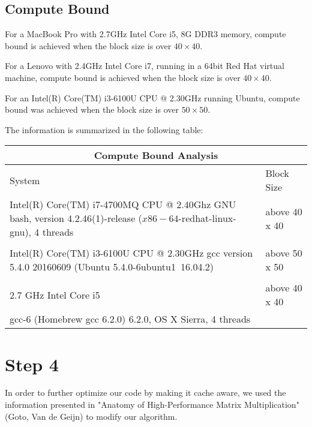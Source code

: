 \documentclass[12pt]{article}
\newcommand{\0}{\mathbf{0}}
\begin{document}
\subsection{Compute Bound}

For a MacBook Pro with 2.7GHz Intel Core i5, 8G DDR3 memory, compute bound is achieved when the block size is over $40\times 40$.

\bigskip

For a Lenovo with 2.4GHz Intel Core i7, running in a 64bit Red Hat virtual machine, compute bound is achieved when the block size is over $40\times 40$.

\bigskip

For an Intel(R) Core(TM) i3-6100U CPU @ 2.30GHz running Ubuntu, compute bound was achieved when the block size is over $50\times 50$. 


\newpage

The information is summarized in the following table:

\begin{center}

    \begin{tabular}{ |p{9cm}||p{3cm}|}
	\hline
	\multicolumn{2}{|c|}{Compute Bound Analysis} \\
	\hline
	System& Block Size \\
	\hline
	Intel(R) Core(TM) i7-4700MQ CPU @ 2.40Ghz
	GNU bash, version 4.2.46(1)-release ($x86-64$-redhat-linux-gnu), 4 threads & above 40 x 40\\
	&  \\
	Intel(R) Core(TM) i3-6100U CPU @ 2.30GHz
	gcc version 5.4.0 20160609 (Ubuntu 5.4.0-6ubuntu1~16.04.2)
	& above 50 x 50 \\
	& \\
	2.7 GHz Intel Core i5 & above 40 x 40   \\
	gcc-6 (Homebrew gcc 6.2.0) 6.2.0, OS X Sierra, 4 threads &  \\
	\hline
    \end{tabular}

\end{center}







	\section{Step 4}
	
	In order to further optimize our code by making it cache aware, we used the information presented in "Anatomy of High-Performance Matrix Multiplication" (Goto, Van de Geijn) to modify our algorithm. \\
	
\end{document}
